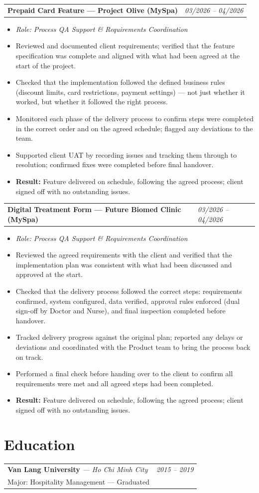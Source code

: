 \documentclass[a4paper,11pt]{article}
\newcommand{\resumeSubheading}[4]{
  \vspace{-1pt}\noindent
  \begin{tabularx}{\textwidth}{X >{\raggedleft\arraybackslash}p{4.2cm}}
    \textbf{#1} \textit{\small --- #2} & \textit{\small #3} \\
    \small #4 & \\
  \end{tabularx}\vspace{-6pt}
}
\newcommand{\resumeProjectHeading}[2]{
  \vspace{-1pt}\noindent
  \begin{tabularx}{\textwidth}{X >{\raggedleft\arraybackslash}p{4.2cm}}
    \textbf{#1} & \textit{\small #2} \\
  \end{tabularx}\vspace{-6pt}
}
\newcommand{\resumeItemListStart}{\begin{itemize}[leftmargin=0.2in, label=\textbullet, itemsep=1pt, parsep=0pt]}
\newcommand{\resumeItemListEnd}{\end{itemize}\vspace{-4pt}}
\newcommand{\resumeItem}[1]{\item\small{#1}}
\begin{document}
\resumeProjectHeading{Prepaid Card Feature --- Project Olive (MySpa)}{03/2026 -- 04/2026}
\resumeItemListStart
  \resumeItem{\textit{Role: Process QA Support \& Requirements Coordination}}
  \resumeItem{Reviewed and documented client requirements; verified that the feature specification was complete and aligned with what had been agreed at the start of the project.}
  \resumeItem{Checked that the implementation followed the defined business rules (discount limits, card restrictions, payment settings) — not just whether it worked, but whether it followed the right process.}
  \resumeItem{Monitored each phase of the delivery process to confirm steps were completed in the correct order and on the agreed schedule; flagged any deviations to the team.}
  \resumeItem{Supported client UAT by recording issues and tracking them through to resolution; confirmed fixes were completed before final handover.}
  \resumeItem{\textbf{Result:} Feature delivered on schedule, following the agreed process; client signed off with no outstanding issues.}
\resumeItemListEnd

\resumeProjectHeading{Digital Treatment Form --- Future Biomed Clinic (MySpa)}{03/2026 -- 04/2026}
\resumeItemListStart
  \resumeItem{\textit{Role: Process QA Support \& Requirements Coordination}}
  \resumeItem{Reviewed the agreed requirements with the client and verified that the implementation plan was consistent with what had been discussed and approved at the start.}
  \resumeItem{Checked that the delivery process followed the correct steps: requirements confirmed, system configured, data verified, approval rules enforced (dual sign-off by Doctor and Nurse), and final inspection completed before handover.}
  \resumeItem{Tracked delivery progress against the original plan; reported any delays or deviations and coordinated with the Product team to bring the process back on track.}
  \resumeItem{Performed a final check before handing over to the client to confirm all requirements were met and all agreed steps had been completed.}
  \resumeItem{\textbf{Result:} Feature delivered on schedule, following the agreed process; client signed off with no outstanding issues.}
\resumeItemListEnd

\section{Education}

\resumeSubheading
  {Van Lang University}{Ho Chi Minh City}{2015 -- 2019}
  {Major: Hospitality Management --- Graduated}
\end{document}
